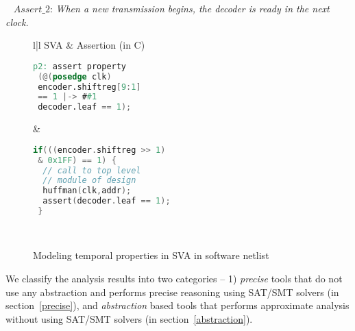 \begin{example}~\label{safety-propnew}
$Assert\_2$: {\em When a new transmission begins, the decoder is ready in the next clock.}
%
\begin{figure}[htbp]
\centering
\scriptsize
\begin{tabular}{l|l}
\hline
SVA & Assertion (in C)
\\
\hline
\begin{lstlisting}[mathescape=true,language=Verilog]
p2: assert property 
 (@(posedge clk) 
 encoder.shiftreg[9:1] 
 == 1 |-> ##1 
 decoder.leaf == 1);
\end{lstlisting}
&
\begin{lstlisting}[mathescape=true,language=C]
 if(((encoder.shiftreg >> 1) 
 & 0x1FF) == 1) {
  // call to top level 
  // module of design
  huffman(clk,addr);  
  assert(decoder.leaf == 1);
 }
\end{lstlisting} \\
\hline
\end{tabular}
\caption{Modeling temporal properties in SVA in software netlist}
\label{figure:prop2}
\end{figure}
\end{example}

%
We classify the analysis results into two categories -- 1) \emph{precise} tools 
that do not use any abstraction and performs precise reasoning using SAT/SMT solvers 
(in section~\ref{precise}), and \emph{abstraction} based tools that performs 
approximate analysis without using SAT/SMT solvers (in section~\ref{abstraction}). 
%
